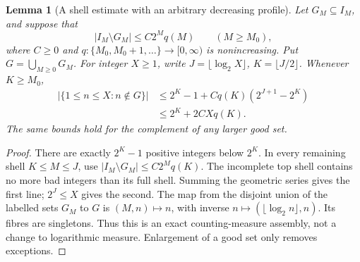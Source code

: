 \documentclass[11pt]{article}
\newtheorem{lemma}[proposition]{Lemma}
\theoremstyle{remark}\newtheorem{remark}[proposition]{Remark}
\begin{document}
\begin{lemma}[A shell estimate with an arbitrary decreasing profile]
\label{lem:shaik-antitone-assembly}
Let \(G_M\subseteq I_M\), and suppose that
\[
 |I_M\setminus G_M|\le C2^M q(M)\qquad(M\ge M_0),
\]
where \(C\ge0\) and \(q:\{M_0,M_0+1,\ldots\}\to[0,\infty)\) is
nonincreasing. Put \(G=\bigcup_{M\ge0}G_M\). For integer \(X\ge1\), write
\(J=\lfloor\log_2X\rfloor\), \(K=\lfloor J/2\rfloor\).
Whenever \(K\ge M_0\),
\begin{equation}\label{eq:shaik-antitone-prefix}
 \begin{split}
 |\{1\le n\le X:n\notin G\}|
 &\le 2^K-1+Cq(K)(2^{J+1}-2^K)\\
 &\le 2^K+2CXq(K).
 \end{split}
\end{equation}
The same bounds hold for the complement of any larger good set.
\end{lemma}
\begin{proof}
There are exactly \(2^K-1\) positive integers below \(2^K\).
In every remaining shell \(K\le M\le J\), use
\(|I_M\setminus G_M|\le C2^M q(K)\). The incomplete top shell contains
no more bad integers than its full shell. Summing the geometric series
gives the first line; \(2^J\le X\) gives the second.
The map from the disjoint union of the labelled sets \(G_M\) to \(G\)
is \((M,n)\mapsto n\), with inverse
\(n\mapsto(\lfloor\log_2n\rfloor,n)\). Its fibres are singletons.
Thus this is an exact counting-measure assembly, not a change to
logarithmic measure. Enlargement of a good set only removes exceptions.
\end{proof}
\end{document}
